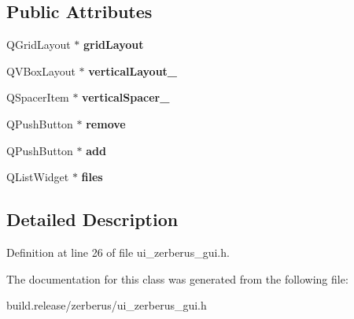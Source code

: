 \subsection*{Public Attributes}
\begin{DoxyCompactItemize}
\item 
\mbox{\label{class_ui___zerberus_gui_ab742b88563c204a4a51891617c097a15}} 
Q\+Grid\+Layout $\ast$ {\bfseries grid\+Layout}
\item 
\mbox{\label{class_ui___zerberus_gui_af95bb5d0ba8e45c7fbaf93ad17523787}} 
Q\+V\+Box\+Layout $\ast$ {\bfseries vertical\+Layout\+\_}
\item 
\mbox{\label{class_ui___zerberus_gui_ab360151cb23d3cf4c33612df06b6d68c}} 
Q\+Spacer\+Item $\ast$ {\bfseries vertical\+Spacer\+\_}
\item 
\mbox{\label{class_ui___zerberus_gui_a5e52dcd0867d4f867f3bbbc1a2d78272}} 
Q\+Push\+Button $\ast$ {\bfseries remove}
\item 
\mbox{\label{class_ui___zerberus_gui_a7902294efa30e49e7b8d43b8867a83ef}} 
Q\+Push\+Button $\ast$ {\bfseries add}
\item 
\mbox{\label{class_ui___zerberus_gui_a7bc7b2000cd464d2aeec997e3019bb96}} 
Q\+List\+Widget $\ast$ {\bfseries files}
\end{DoxyCompactItemize}


\subsection{Detailed Description}


Definition at line 26 of file ui\+\_\+zerberus\+\_\+gui.\+h.



The documentation for this class was generated from the following file\+:\begin{DoxyCompactItemize}
\item 
build.\+release/zerberus/ui\+\_\+zerberus\+\_\+gui.\+h\end{DoxyCompactItemize}
